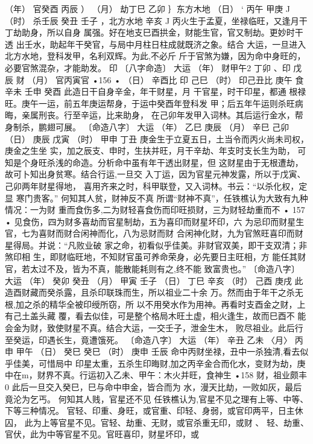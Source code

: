 （年） 官癸酉 丙辰 ）
（月） 劫丁巳 乙卯 ｝东方木地
（日） ‘ 丙午 甲庚 J
（时） 杀壬辰 癸丑
壬子 ，北方水地
辛亥 J
丙火生于孟夏，坐禄临旺，又逢月干丁劫助身，所以自身
属强。好在地支巳酉拱金，财能生官，官又制劫。更妙时干透
出壬水，助起年干癸官，与局中月柱日柱成就既济之象。结合
大运，一旦进入北方水地，登科发甲，名利双辉。为此,不必斤
斤于官煞为嫌，因为命中身旺的，必要官煞混杂，才能助发。
印
〔八字命造〕 大运
（年） 财甲午2 丁卯 、印 戊辰
财
（月） 官丙寅官
•156 •
（日） 辛酉比
印
己巳
（时） 印己丑比 庚午
食
辛未
壬申
癸酉
此造日干自身辛金，年干财星，月 干官星，时干印星，都通
根禄旺。庚午一运，前五年庚运帮身，于运中癸酉年登科发
甲；后五年午运则杀旺病晦，亲属刑丧。行至辛运，比来助身，
在己卯年发甲入词林。其后运行金水，帮身制杀，鹏翅可展。
〔命造八字〕 大运
（年） 乙巳 庚辰
（月） 辛巳 己卯
（日） 庚辰 戊寅
（时） 甲申 丁丑
庚金生于立夏五日，土当令而丙火尚未司权，庚金之生坐
实，加之辰支、申时，生扶并旺，月干辛劫、年支时支长生为助，
可知是个身旺杀浅的命造。分析命中虽有年干透出财星，但
这财星由于无根遭劫，故可卜知出身贫寒。结合行运,一旦交
入丁运，因为官星元神发露，所以于戊寅、己卯两年财星得地，
喜用齐来之时，科甲联登，又入词林。书云：“以杀化权，定显
寒门贵客。”
何知其人贫，财神反不真
所谓“财神不真”，任铁樵认为大致有九种情况：一为财
重而食伤多,二为财轻喜食伤而印旺损财，三为财轻劫重而不
• 157 •
见食伤，四为财多喜劫而官星制劫，五为喜印而财星坏印，六
为忌印而财星生官，七为喜财而财合闲神而化，八为忌财而财
合闲神化财，九为官煞旺喜印而财星得局。并说：“凡败业破
家之命，初看似乎佳美。非财官双美，即干支双清；非煞印相
生，即财临旺地，不知财官虽可养命荣身，必先要日主旺相，方
能任其财官，若太过不及，皆为不真，能散能耗则有之,终不能
致富贵也。”
〔命造八字〕 大运
（年） 癸卯 癸丑
（月） 甲寅 壬子
（日） 丁巳 辛亥
（时） 己酉 庚戌
此造酉财藏而癸杀露，且杀印联珠而生，所以祖业二十余
万。然而由于年干之杀无根,加之杀的精华全被印绶所窃，所
以不用癸水作为用神。再看时支酉金之财，上有己土盖头藏
覆，看去似佳，可是整个格局木旺土虚，相火逢生，故而巳酉不
能会金为财，致使财星不真。结合大运，一交壬子，泄金生木，
败尽祖业。此后行至癸运，印遇长生，竟遭饿死。
〔命造八字〕 大运
（年） 辛丑 乙未
〈月〉 丙申 甲午
（日） 癸巳 癸巳
（时） 庚申 壬辰
命中丙财坐禄，丑中一杀独清,看去似乎佳美，可惜局中
印星太重，五杀生印晦财,加之丙辛金合而化水，变财为劫，庚
中在m，财界不真。行运初入乙未、甲午：木火并旺，食神生
•158
财，祖业颇丰0 此后一旦交入癸巳，巳与命中申金，皆合而为
水，漫天比劫，一败如灰，最后竟沦为乞丐。
何知其人贱，官星还不见
任铁樵认为,官星不见之理有上等、中等、下等三种情况。
官轻、印重、身旺，或官重、印轻、身弱，或官印两平，日主休囚，
此为上等官星不见。官轻、劫重、无财，或官杀重无印，或财 、
轻、劫重、官伏，此为中等官星不见。官旺喜印，财星坏印，或
